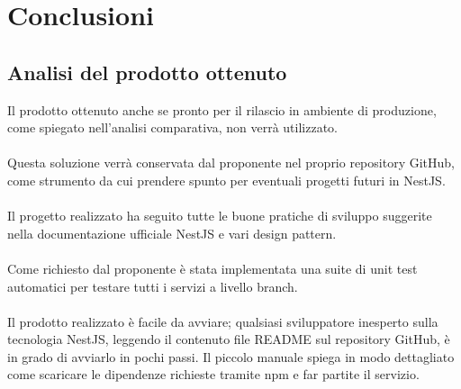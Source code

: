 
\chapter{Conclusioni}
\label{cap:conclusioni}


\section{Analisi del prodotto ottenuto}
Il prodotto ottenuto anche se pronto per il rilascio in ambiente di produzione, come spiegato nell'analisi
comparativa, non verrà utilizzato.
\\\\
Questa soluzione verrà conservata dal proponente nel proprio repository GitHub, come strumento
da cui prendere spunto per eventuali progetti futuri in NestJS.
\\\\
Il progetto realizzato ha seguito tutte le buone pratiche di sviluppo suggerite nella documentazione ufficiale
NestJS e vari design pattern.
\\\\
Come richiesto dal proponente è stata implementata una suite di unit test automatici per testare tutti i servizi 
a livello branch.
\\\\
Il prodotto realizzato è facile da avviare; qualsiasi sviluppatore inesperto sulla tecnologia NestJS, 
leggendo il contenuto file README sul repository GitHub, è in grado di avviarlo in pochi passi. Il piccolo manuale spiega in modo 
dettagliato come scaricare le 
dipendenze richieste tramite npm e far partite il servizio.

